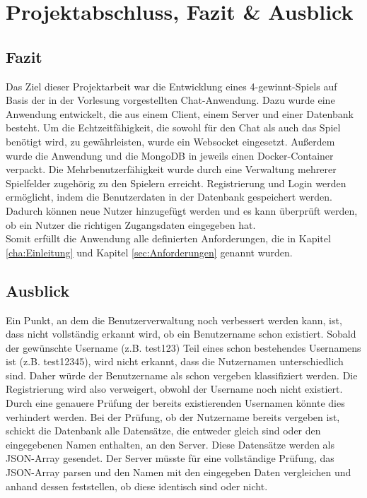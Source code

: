 
\chapter{Projektabschluss, Fazit \& Ausblick}\label{cha:Schlussbetrachtung}
\section{Fazit}\label{sec:Fazit}
Das Ziel dieser Projektarbeit war die Entwicklung eines 4-gewinnt-Spiels auf Basis der in der Vorlesung vorgestellten Chat-Anwendung. Dazu wurde eine Anwendung entwickelt, die aus einem Client, einem Server und einer Datenbank besteht. Um die Echtzeitfähigkeit, die sowohl für den Chat als auch das Spiel benötigt wird, zu gewährleisten, wurde ein Websocket eingesetzt. Außerdem wurde die Anwendung und die MongoDB in jeweils einen Docker-Container verpackt. Die Mehrbenutzerfähigkeit wurde durch eine Verwaltung mehrerer Spielfelder zugehörig zu den Spielern erreicht. Registrierung und Login werden ermöglicht, indem die Benutzerdaten in der Datenbank gespeichert werden. Dadurch können neue Nutzer hinzugefügt werden und es kann überprüft werden, ob ein Nutzer die richtigen Zugangsdaten eingegeben hat.\\
Somit erfüllt die Anwendung alle definierten Anforderungen, die in Kapitel \ref{cha:Einleitung} und Kapitel \ref{sec:Anforderungen} genannt wurden.

\section{Ausblick}\label{sec:Ausblick}
Ein Punkt, an dem die Benutzerverwaltung noch verbessert werden kann, ist, dass nicht vollständig erkannt wird, ob ein Benutzername schon existiert. Sobald der gewünschte Username (z.B. test123) Teil eines schon bestehendes Usernamens ist (z.B. test12345), wird nicht erkannt, dass die Nutzernamen unterschiedlich sind. Daher würde der Benutzername als schon vergeben klassifiziert werden. Die Registrierung wird also verweigert, obwohl der Username noch nicht existiert. Durch eine genauere Prüfung der bereits existierenden Usernamen könnte dies verhindert werden.
Bei der Prüfung, ob der Nutzername bereits vergeben ist, schickt die Datenbank alle Datensätze, die entweder gleich sind oder den eingegebenen Namen enthalten, an den Server. Diese Datensätze werden als JSON-Array gesendet. Der Server müsste für eine vollständige Prüfung, das JSON-Array parsen und den Namen mit den eingegeben Daten vergleichen und anhand dessen feststellen, ob diese identisch sind oder nicht.

